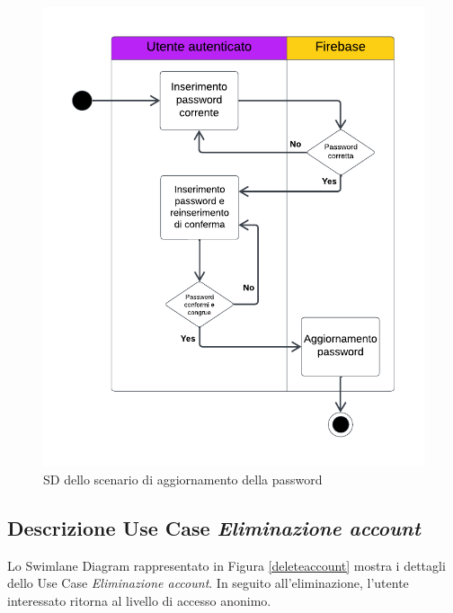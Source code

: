 \documentclass[11pt, a4paper]{article}
\theoremstyle{definition} %
\begin{document}
\begin{figure}[H]
\centering
\hspace*{-0.7cm}
\includegraphics[scale = 1]{materiale/ucdiagrams/swimlanepassword.pdf}
\caption{SD dello scenario di aggiornamento della password}
\label{slpassword}
\end{figure}

\newpage
\subsection*{Descrizione Use Case \textit{Eliminazione account}}
Lo Swimlane Diagram rappresentato in Figura \ref{deleteaccount} mostra
i dettagli dello Use Case \textit{Eliminazione account}. In seguito
all'eliminazione, l'utente interessato ritorna al livello di accesso
anonimo.
\end{document}

